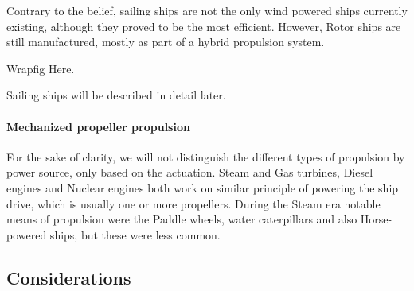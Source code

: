 Contrary to the belief, sailing ships are not the only wind powered ships currently existing, although they proved to be the most efficient. However, Rotor ships are still manufactured, mostly as part of a hybrid propulsion system.

Wrapfig Here.

Sailing ships will be described in detail later.

\paragraph{Mechanized propeller propulsion}

For the sake of clarity, we will not distinguish the different types of propulsion by power source, only based on the actuation. Steam and Gas turbines, Diesel engines and Nuclear engines both work on similar principle of powering the ship drive, which is usually one or more propellers. During the Steam era notable means of propulsion were the Paddle wheels, water caterpillars and also Horse-powered ships, but these were less common.

\subsection{Considerations}